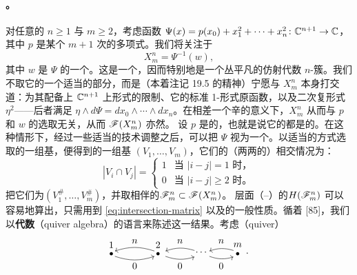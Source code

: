 \paragraph{\trGenerator{}。}\label{sub:milnor-fibre-generators}
对任意的 $n\ge 1$ 与 $m\ge 2$，考虑函数 $\Psi(x)=p(x_0)+x_1^2+\cdots+x_n^2\colon\mathbb{C}^{n+1}\to\mathbb{C}$，其中 $p$ 是某个 $m+1$ 次的多项式。我们将关注于
\begin{equation*}
X^n_m=\Psi^{-1}(w),
\end{equation*}
其中 $w$ 是 $\Psi$ 的一个\trRegularValue。这是一个\trSmooth\trHypersurface，因而特别地是一个\trCanonical{}丛平凡的仿射代数 $n$-簇。我们不取它的一个适当的\trCompact{}部分，而是（本着注记 19.5 的精神）宁愿与 $X^n_m$ 本身打交道：为其配备上 $\mathbb{C}^{n+1}$ 上\trFlat\trKaehler{}形式的限制、它的标准 1-形式原函数，以及二次复\trVolume{}形式 $\eta^2$——后者满足 $\eta\wedge d\Psi=dx_0\wedge\cdots\wedge dx_n$。在相差一个\trExact{}辛\trIsomorphism{}的意义下，$X^n_m$ 从而与 $p$ 和 $w$ 的选取无关，从而 $\mathscr{F}(X^n_m)$ 亦然。
设 $p$ 是\trGeneric{}的，也就是说它的\trCriticalPoint{}都是\trNondegenerate{}的。在这种情形下，经过一些适当的技术调整之后，可以把 $\Psi$ 视为一个\trLefschetzFibration。以适当的方式选取\trVanishingPath{}的一组基，便得到\trVanishingCycle{}的一组基 $(V_1,\ldots,V_m)$，它们的（两两\trTransverse{}的）相交情况为：
\begin{equation}\label{eq:intersection-matrix}
|V_i\cap V_j|=
\begin{cases}
1 & \text{当 } |i-j|=1 \text{ 时，} \\
0 & \text{当 } |i-j|\ge 2 \text{ 时。}
\end{cases}
\end{equation}
把它们\trLift{}为\trLagrange\trBrane{}$(V_1^\#,\ldots,V_m^\#)$，并取相伴的\trFullSubcategory{}$\mathscr{F}^n_m\subset\mathscr{F}(X^n_m)$。
\trCohomology{}层面（\trDonaldson--\trFukaya）的\trCategory{}$H(\mathscr{F}^n_m)$ 可以容易地算出，只需用到 \eqref{eq:intersection-matrix} 以及\trFloerCohomology{}的一般性质。循着 [85]，我们以\textbf{\trQuiver{}代数}（quiver algebra）的语言来陈述这一结果。考虑\trGraded{}\textbf{\trQuiver}（quiver）
\begin{equation}\label{eq:graded-quiver}
\begin{tikzpicture}[line cap=round,line join=round]
\fill (0,0) circle (1.7pt);
\node at (0,0.32) {$1$};
\fill (1.7,0) circle (1.7pt);
\node at (1.7,0.32) {$2$};
\node at (3.3,0.05) {$\cdots$};
\fill (4.6,0) circle (1.7pt);
\node at (4.6,0.32) {$m$};
\node at (4.95,0.02) {$.$};
\draw[->] (1.56,0.1) to[bend right=18] (0.14,0.1);
\node at (0.85,0.45) {$n$};
\draw[->] (0.14,-0.1) to[bend right=18] (1.56,-0.1);
\node at (0.85,-0.45) {$0$};
\draw[->] (3.02,0.12) to[bend right=18] (1.98,0.1);
\node at (2.5,0.45) {$n$};
\draw[->] (1.98,-0.1) to[bend right=18] (3.02,-0.12);
\node at (2.5,-0.45) {$0$};
\draw[->] (4.44,0.12) to[bend right=18] (3.58,0.1);
\node at (4.0,0.45) {$n$};
\draw[->] (3.58,-0.1) to[bend right=18] (4.44,-0.12);
\node at (4.0,-0.45) {$0$};
\end{tikzpicture}
\end{equation}
